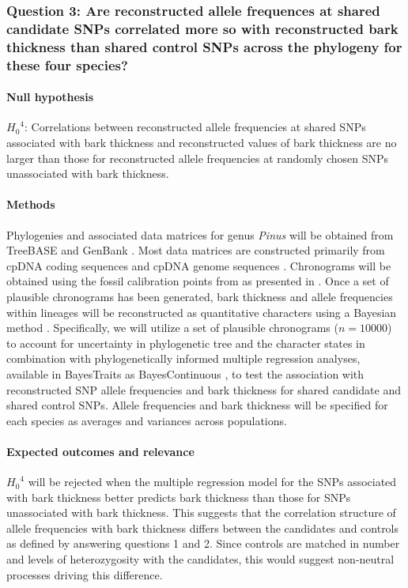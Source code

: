 \subsubsection*{Question 3: Are reconstructed allele frequences at shared candidate SNPs correlated more so with 
reconstructed bark thickness than shared control SNPs across the phylogeny for these four species?}

\paragraph{Null hypothesis} ${H_0}^4$: Correlations between reconstructed allele frequencies at shared SNPs associated with 
bark thickness and reconstructed values of bark thickness are no larger than those for reconstructed allele frequencies at 
randomly chosen SNPs unassociated with bark thickness.

\paragraph{Methods} Phylogenies and associated data matrices for genus \emph{Pinus} will be obtained from 
TreeBASE \citep{Morell:to} and GenBank \citep{Benson:2012kf}. Most data matrices are constructed primarily from 
cpDNA coding sequences \citep{Eckert:2006iw, Gernandt:2008df} and cpDNA genome sequences \citep{Parks:2009bd}. 
Chronograms will be obtained using the fossil calibration points from \citet{Willyard:2007in} as presented in \citet{He:2012bz}. 
Once a set of plausible chronograms has been 
generated, bark thickness and allele frequencies within lineages will be reconstructed as quantitative 
characters using a Bayesian method \citep{Pagel:2004ic}.
Specifically, we will utilize a set of plausible chronograms ($n =  \num{10000}$) to account for uncertainty in 
phylogenetic tree and the character states in combination with phylogenetically informed multiple 
regression analyses, available in BayesTraits as BayesContinuous \citep{Pagel:2004ic},  to test the association with 
reconstructed SNP allele frequencies and bark thickness for shared candidate and shared control SNPs. 
Allele frequencies and bark thickness will be specified for each species as averages and variances across populations.

\paragraph{Expected outcomes and relevance} ${H_0}^4$ will be rejected when the multiple regression model for the 
SNPs associated with bark thickness better predicts bark thickness than those for SNPs unassociated with bark thickness. 
This suggests that the correlation structure of allele frequencies with bark thickness differs between the candidates and controls 
as defined by answering questions 1 and 2. Since controls are matched in number and levels of heterozygosity with the candidates, 
this would suggest non-neutral processes driving this difference.

